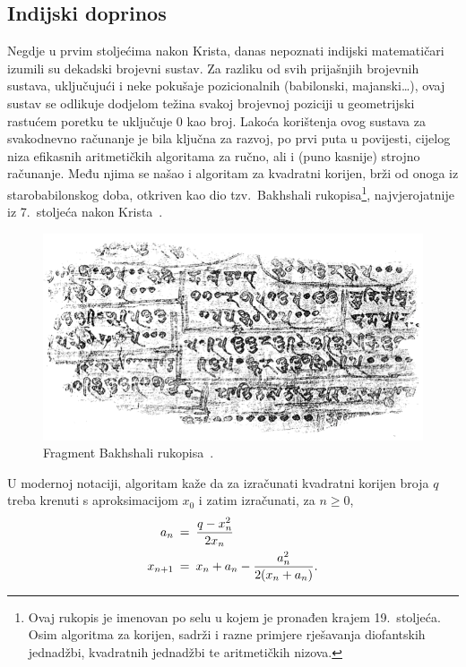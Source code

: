 \documentclass[12pt]{scrartcl}
\begin{document}
\subsection{Indijski doprinos}
Negdje u prvim stoljećima nakon Krista, danas nepoznati indijski matematičari izumili su dekadski brojevni sustav. Za razliku od svih prijašnjih brojevnih sustava,
uključujući i neke pokušaje pozicionalnih (babilonski, majanski\ldots), ovaj sustav se odlikuje dodjelom težina svakoj brojevnoj poziciji u geometrijski
rastućem poretku te uključuje $0$ kao broj. Lakoća korištenja ovog sustava za svakodnevno računanje je bila ključna za razvoj, po prvi puta
u povijesti, cijelog niza
efikasnih aritmetičkih algoritama za ručno, ali i (puno kasnije) strojno računanje. Među njima se našao i algoritam za kvadratni korijen, brži od onoga
iz starobabilonskog doba, otkriven kao dio tzv.\ Bakhshali rukopisa\footnote{Ovaj rukopis je imenovan po selu u kojem je pronađen krajem 19.\ stoljeća.
Osim algoritma za korijen, sadrži i razne primjere rješavanja diofantskih jednadžbi, kvadratnih jednadžbi te aritmetičkih nizova.},
najvjerojatnije iz 7.\ stoljeća nakon Krista~\cite{bakhshali}.

\begin{figure}[h]
    \center
    \includegraphics[scale=0.5]{bakhshali}
    \caption{Fragment Bakhshali rukopisa~\cite{bakhshali}.}
\end{figure}

U modernoj notaciji, algoritam kaže da za izračunati kvadratni korijen broja $q$ treba krenuti s aproksimacijom $x_0$ i zatim izračunati,
za $n\geq 0$,
\begin{align}
    a_n\: &=\: \frac{q-x^2_n}{2x_n}\\
    x_{n+1}\: &=\:x_n + a_n - \frac{a^2_n}{2(x_n + a_n)}\text.%
\end{align}
\end{document}
